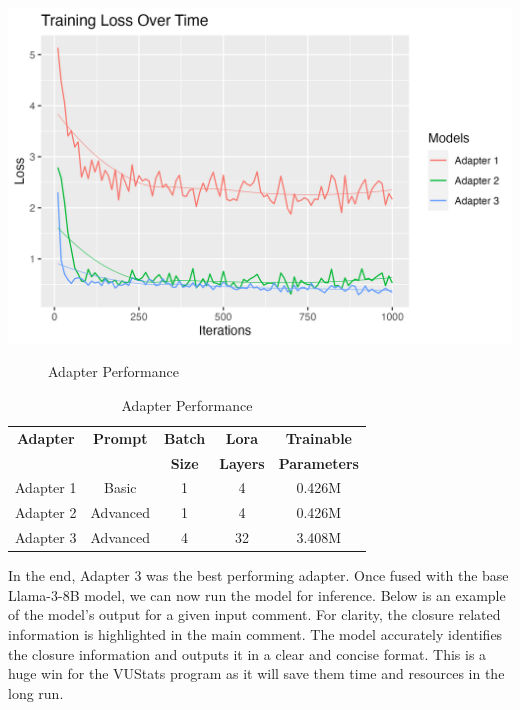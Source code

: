 \documentclass[12pt]{article}
\begin{document}
\begin{center}
    \includegraphics[width=1\textwidth]{../Visuals/Loss.png}
    \begin{figure}
        \caption{Adapter Performance}
    \end{figure}
\end{center}

\begin{center}
    \begin{table}[ht]
        \centering
        \begin{tabular}{|c|c|c|c|c|}
            \hline
            \textbf{Adapter} & \textbf{Prompt} & \textbf{Batch} & \textbf{Lora} & \textbf{Trainable} \\
             & & \textbf{Size} & \textbf{Layers} &  \textbf{Parameters}\\
            \hline
            Adapter 1 & Basic & 1 & 4 & 0.426M \\
            \hline
            Adapter 2 & Advanced & 1 & 4 & 0.426M \\
            \hline
            Adapter 3 & Advanced & 4 & 32 & 3.408M \\
            \hline
            \end{tabular}
        \caption{Adapter Performance}
    \end{table}
\end{center}
In the end, Adapter 3 was the best performing adapter. Once fused with the base Llama-3-8B model, we can now run the model for inference. Below is an example of the model's output for a given input comment. For clarity, the closure related information is highlighted in the main comment. The model accurately identifies the closure information and outputs it in a clear and concise format. This is a huge win for the VUStats program as it will save them time and resources in the long run.
\end{document}
